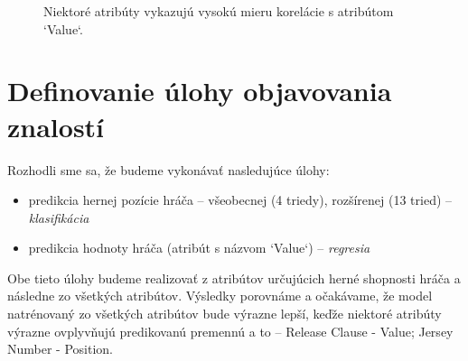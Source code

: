 \documentclass[runningheads]{llncs}
\begin{document}
\begin{figure}%
    \centering
    \qquad
    \caption{Niektoré atribúty vykazujú vysokú mieru korelácie s atribútom `Value`.}%
    \label{fig:wage_scatter_plot}%
\end{figure}


\section{Definovanie úlohy objavovania znalostí}

Rozhodli sme sa, že budeme vykonávať nasledujúce úlohy:
\begin{itemize}
    \item predikcia hernej pozície hráča -- všeobecnej (4 triedy), rozšírenej (13 tried) -- \textit{klasifikácia}
    \item predikcia hodnoty hráča (atribút s názvom `Value`) -- \textit{regresia}
\end{itemize}

Obe tieto úlohy budeme realizovať z atribútov určujúcich herné shopnosti hráča a následne zo všetkých atribútov. Výsledky porovnáme a očakávame, že model natrénovaný zo všetkých atribútov bude výrazne lepší, keďže niektoré atribúty výrazne ovplyvňujú predikovanú premennú a to -- Release Clause - Value; Jersey Number - Position. 
\end{document}
